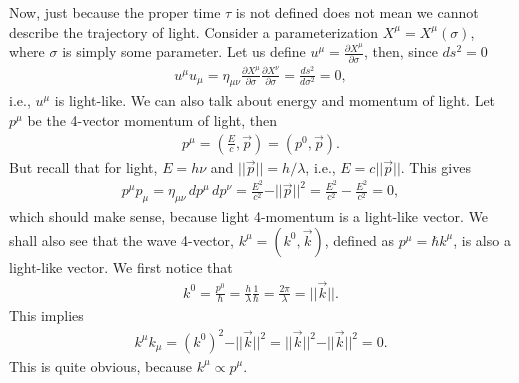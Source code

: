 \documentclass{article}
\theoremstyle{definition}
\begin{document}
Now, just because the proper time $\tau$ is not defined does not mean we cannot describe the trajectory of light. Consider a parameterization $X^\mu = X^\mu(\sigma)$, where $\sigma$ is simply some parameter. Let us define $u^\mu = \frac{\partial X^\mu}{\partial \sigma}$, then, since $ds^2 = 0$
\begin{align*}
u^\mu u_\mu = \eta_{\mu\nu}\frac{\partial X^\mu}{\partial \sigma}\frac{\partial X^\nu}{\partial \sigma} = \frac{ds^2}{d\sigma^2} = 0,
\end{align*}
i.e., $u^\mu$ is light-like. We can also talk about energy and momentum of light. Let $p^\mu$ be the 4-vector momentum of light, then
\begin{align*}
p^\mu = \left( \frac{E}{c}, \vec{p} \right) = \left( p^0, \vec{p} \right).   
\end{align*}
But recall that for light, $E = h\nu$ and $\vert\vert \vec{p} \vert\vert = h/\lambda$, i.e., $E = c\vert\vert \vec{p}\vert\vert$. This gives
\begin{align*}
p^\mu p_\mu = \eta_{\mu\nu}\,dp^\mu\,dp^\nu = \frac{E^2}{c^2} - \vert\vert\vec{p}\vert\vert^2 = \frac{E^2}{c^2} - \frac{E^2}{c^2} = 0,
\end{align*}
which should make sense, because light 4-momentum is a light-like vector. We shall also see that the wave 4-vector, $k^\mu = \left( k^0, \vec{k} \right)$, defined as $p^\mu = \hbar k^\mu$, is also a light-like vector. We first notice that 
\begin{align*}
k^0 = \frac{p^0}{\hbar} = \frac{h}{\lambda}\frac{1}{\hbar} = \frac{2\pi}{\lambda} = \vert\vert \vec{k} \vert\vert.
\end{align*}
This implies
\begin{align*}
k^\mu k_\mu = \left( k^0 \right) ^2 - \vert\vert\vec{k}\vert\vert^2 =  \vert\vert\vec{k}\vert\vert^2-\vert\vert\vec{k}\vert\vert^2=0.
\end{align*}
This is quite obvious, because $k^\mu \propto p^\mu$.\\
\end{document}
